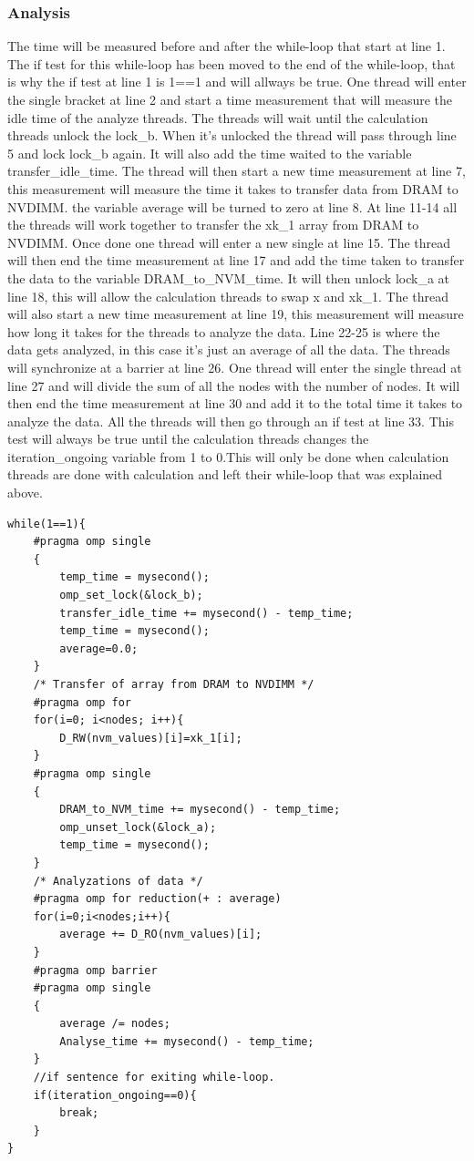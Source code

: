 \documentclass[12pt,a4paper,USenglish]{article}      %
\begin{document}
\subsubsection{Analysis}
The time will be measured before and after the while-loop that start at line 1. The if test for this while-loop has been moved to the end of the while-loop, that is why the if test at line 1 is 1==1 and will allways be true. 
One thread will enter the single bracket at line 2 and start a time measurement that will measure the idle time of the analyze threads. The threads will wait until the calculation threads unlock the lock\_b. When it's unlocked the thread will pass through line 5 and lock lock\_b again. It will also add the time waited to the variable transfer\_idle\_time. The thread will then start a new time measurement at line 7, this measurement will measure the time it takes to transfer data from DRAM to NVDIMM. the variable average will be turned to zero at line 8.
At line 11-14 all the threads will work together to transfer the xk\_1 array from DRAM to NVDIMM.
Once done one thread will enter a new single at line 15. The thread will then end the time measurement at line 17 and add the time taken to transfer the data to the variable DRAM\_to\_NVM\_time.
It will then unlock lock\_a at line 18, this will allow the calculation threads to swap x and xk\_1. The thread will also start a new time measurement at line 19, this measurement will measure how long it takes for the threads to analyze the data. Line 22-25 is where the data gets analyzed, in this case it's just an average of all the data. 
The threads will synchronize at a barrier at line 26. One thread will enter the single thread at line 27 and will divide the sum of all the nodes with the number of nodes.
It will then end the time measurement at line 30 and add it to the total time it takes to analyze the data.
All the threads will then go through an if test at line 33. This test will always be true until the calculation threads changes the iteration\_ongoing variable from 1 to 0.This will only be done when calculation threads are done with calculation and left their while-loop that was explained above.

\begin{lstlisting}[caption=Analyze]
while(1==1){
	#pragma omp single
	{
		temp_time = mysecond();
		omp_set_lock(&lock_b);
		transfer_idle_time += mysecond() - temp_time;
		temp_time = mysecond();
		average=0.0;
	}
	/* Transfer of array from DRAM to NVDIMM */
	#pragma omp for
	for(i=0; i<nodes; i++){ 
		D_RW(nvm_values)[i]=xk_1[i];
	}
	#pragma omp single 
	{
		DRAM_to_NVM_time += mysecond() - temp_time;
		omp_unset_lock(&lock_a);
		temp_time = mysecond();
	}
	/* Analyzations of data */
	#pragma omp for reduction(+ : average)
	for(i=0;i<nodes;i++){
		average += D_RO(nvm_values)[i];
	}
	#pragma omp barrier
	#pragma omp single
	{
		average /= nodes;
		Analyse_time += mysecond() - temp_time;
	}
	//if sentence for exiting while-loop.
	if(iteration_ongoing==0){
		break;
	}
}
\end{lstlisting}
\end{document}
